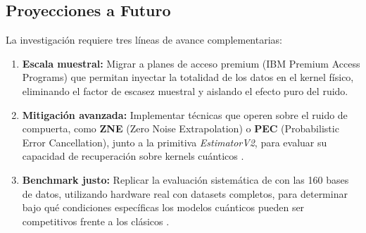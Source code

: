 \subsection*{Proyecciones a Futuro}
La investigaci\'on requiere tres l\'ineas de avance complementarias:
\begin{enumerate}
    \item \textbf{Escala muestral:} Migrar a planes de acceso premium (IBM Premium Access Programs) que permitan inyectar la totalidad de los datos en el kernel f\'isico, eliminando el factor de escasez muestral y aislando el efecto puro del ruido.
    \item \textbf{Mitigaci\'on avanzada:} Implementar t\'ecnicas que operen sobre el ruido de compuerta, como \textbf{ZNE} (Zero Noise Extrapolation) o \textbf{PEC} (Probabilistic Error Cancellation), junto a la primitiva \textit{EstimatorV2}, para evaluar su capacidad de recuperaci\'on sobre kernels cu\'anticos \citep{larocca2025}.
    \item \textbf{Benchmark justo:} Replicar la evaluaci\'on sistem\'atica de \citet{bowles2024} con las 160 bases de datos, utilizando hardware real con datasets completos, para determinar bajo qu\'e condiciones espec\'ificas los modelos cu\'anticos pueden ser competitivos frente a los cl\'asicos \citep{huang2021, biamonte2017}.
\end{enumerate}
